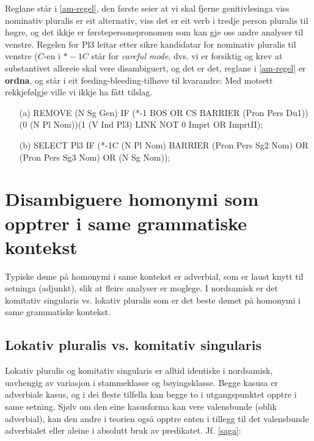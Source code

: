 \documentclass[a4paper,norsk]{article}
\begin{document}
Reglane står i \ref{am-regel}, den første seier at vi skal fjerne genitivlesinga viss nominativ pluralis er eit alternativ, viss det er eit verb i tredje person pluralis til høgre, og det ikkje er førstepersonspronomen som kan gje  oss andre analyser til venstre. Regelen for Pl3 leitar etter sikre kandidatar for nominativ pluralis til venstre ($C$-en i $*-1C$ står for \textit{careful mode}, dvs. vi er forsiktig og krev at substantivet allereie skal vere disambiguert, og det er det, reglane i \ref{am-regel} er \textbf{ordna}, og står i eit feeding-bleeding-tilhøve til kvarandre: Med motsett rekkjefølgje ville vi ikkje ha fått tilslag. %

\begin{example}\label{am-regel}
\begin{itemize}
\item[(a)] REMOVE (N Sg Gen) IF (*-1 BOS OR CS BARRIER (Pron Pers Du1))(0 (N Pl Nom))(1 (V Ind Pl3) LINK NOT 0 Imprt OR ImprtII);
\item[(b)] SELECT Pl3 IF (*-1C (N Pl Nom) BARRIER (Pron Pers Sg2 Nom) OR  (Pron Pers Sg3 Nom) OR (N Sg Nom));
\end{itemize}
\end{example}



\section{Disambiguere homonymi som opptrer i same grammatiske kontekst}

Typiske døme på homonymi i same kontekst er adverbial, som er laust knytt til setninga (adjunkt), slik at fleire analyser er moglege. I nordsamisk er det komitativ singularis vs. lokativ pluralis som er det beste dømet på homonymi i same grammatiske kontekst. %





\subsection{Lokativ pluralis vs. komitativ singularis}


Lokativ pluralis og komitativ singularis er alltid identiske i nordsamisk, uavhengig av variasjon i stammeklasse og bøyingsklasse. Begge kasusa er adverbiale kasus, og i dei fleste tilfella kan begge to i utgangspunktet opptre i same setning. Sjølv om den eine kasusforma kan vere valensbunde (oblik adverbial), kan den andre i teorien også opptre enten i tillegg til det valensbunde adverbialet eller aleine i absolutt bruk av predikatet. Jf. \ref{saga}:
\end{document}
